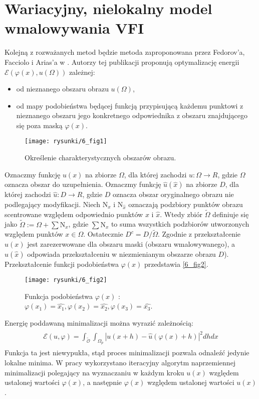 \documentclass[12pt, twoside, openany]{report}
\theoremstyle{definition}
\newcommand*{\abs}[1]{\left\vert{#1}\right\vert}
\begin{document}
\section{Wariacyjny, nielokalny model wmalowywania VFI}
Kolejną z rozważanych metod będzie metoda zaproponowana przez Fedorov'a, Facciolo i Arias'a w \cite{arias2011variational}. Autorzy tej publikacji proponują optymalizację energii $\mathcal{E}(\varphi(x), u(\Omega))$ zależnej:
\begin{itemize}
\item
od nieznanego obszaru obrazu $u(\Omega)$,
\item
od mapy podobieństwa będącej funkcją przypisującą każdemu punktowi z nieznanego obszaru jego konkretnego odpowiednika z obszaru znajdującego się poza maską $\varphi(x)$.
\end{itemize}
\begin{figure}[!h]
	\centering
	\texttt{[image: rysunki/6\_fig1]}
	\caption{Określenie charakterystycznych obszarów obrazu.}
	\label{6_fig1}
\end{figure}
Oznaczmy funkcję $u(x)$ na zbiorze $\Omega$, dla której zachodzi $u:\Omega \rightarrow R$, gdzie $\Omega$ oznacza obszar do uzupełnienia.
Oznaczmy funkcję $\hat{u}(\hat{x})$ na zbiorze $D$, dla której zachodzi $\hat{u} : D \rightarrow R$, gdzie $D$ oznacza obszar oryginalnego obrazu nie podlegający modyfikacji.
Niech $\mathrm{N}_x$ i $\mathrm{N}_{\hat{x}}$ oznaczają podzbiory punktów obrazu scentrowane względem odpowiednio punktów $x$ i $\hat{x}$.
Wtedy zbiór $\widetilde{\Omega}$ definiuje się jako $\widetilde{\Omega} := \Omega + \sum {\mathrm{N}}_x$, gdzie $\sum {\mathrm{N}}_x$ to suma wszystkich podzbiorów utworzonych względem punktów $x \in \Omega$. Ostatecznie $D^c = D / \widetilde{\Omega}$.
Zgodnie z \cite{arias2011variational} przekształcenie $u(x)$ jest zarezerwowane dla obszaru maski (obszaru wmalowywanego), a $\hat{u}(\hat{x})$ odpowiada przekształceniu w niezmienianym obszarze obrazu $D$). 
Przekształcenie funkcji podobieństwa $\varphi(x)$ przedstawia \autoref{6_fig2}.
\begin{figure}[!h]
	\centering
	\texttt{[image: rysunki/6\_fig2]}
	\caption{Funkcja podobieństwa $\varphi(x)$ : $\varphi(x_1)=\hat{x_1}, \varphi(x_2)=\hat{x_2}, \varphi(x_3)=\hat{x_3}$.}
	\label{6_fig2}
\end{figure}
Energię poddawaną minimalizacji można wyrazić zależnością:
\begin{align}
\begin{aligned}
\mathcal{E}(u,\varphi) = \int_{\mathcal{\widetilde{O}}}\int_{\Omega_p}\abs{u(x+h) - \hat{u}(\varphi(x)+h)}^2dhdx
\end{aligned}
\end{align}
Funkcja ta jest niewypukła, stąd proces minimalizacji pozwala odnaleźć jedynie lokalne minima. W pracy wykorzystano iteracyjny algorytm naprzemiennej minimalizacji polegający na wyznaczaniu w każdym kroku $u(x)$ względem ustalonej wartości $\varphi(x)$, a następnie $\varphi(x)$ względem ustalonej wartości $u(x)$.
\end{document}
